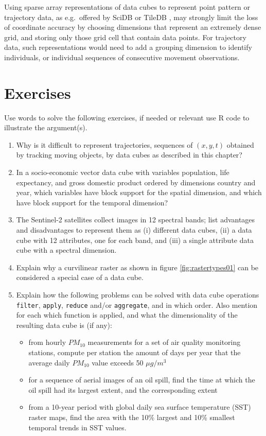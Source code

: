 \documentclass[]{book}
\providecommand{\tightlist}{%
  \setlength{\itemsep}{0pt}\setlength{\parskip}{0pt}}
\begin{document}
Using sparse array representations of data cubes to represent
point pattern or trajectory data, as e.g.~offered by SciDB
\citep{brown2010overview} or TileDB \citep{tiledb}, may strongly limit the
loss of coordinate accuracy by choosing dimensions that represent
an extremely dense grid, and storing only those grid cell that
contain data points. For trajectory data, such representations
would need to add a grouping dimension to identify individuals,
or individual sequences of consecutive movement observations.

\hypertarget{exercises-5}{%
\section{Exercises}\label{exercises-5}}

Use words to solve the following exercises, if needed or relevant
use R code to illustrate the argument(s).

\begin{enumerate}
\def\labelenumi{\arabic{enumi}.}
\item
  Why is it difficult to represent trajectories, sequences of
  \((x,y,t)\) obtained by tracking moving objects, by data cubes as
  described in this chapter?
\item
  In a socio-economic vector data cube with variables population,
  life expectancy, and gross domestic product ordered by dimensions country and
  year, which variables have block support for the spatial dimension,
  and which have block support for the temporal dimension?
\item
  The Sentinel-2 satellites collect images in 12 spectral bands;
  list advantages and disadvantages to represent them as (i) different
  data cubes, (ii) a data cube with 12 attributes, one for each band,
  and (iii) a single attribute data cube with a spectral dimension.
\item
  Explain why a curvilinear raster as shown in figure
  \ref{fig:rastertypes01} can be considered a special case of a
  data cube.
\item
  Explain how the following problems can be solved with data cube
  operations \texttt{filter}, \texttt{apply}, \texttt{reduce} and/or \texttt{aggregate}, and
  in which order. Also mention for each which function is applied,
  and what the dimensionality of the resulting data cube is (if any):

  \begin{itemize}
  \tightlist
  \item
    from hourly \(PM_{10}\) measurements for a set of air quality
    monitoring stations, compute per station the amount of days
    per year that the average daily \(PM_{10}\) value exceeds
    50 \(\mu g/m^3\)
  \item
    for a sequence of aerial images of an oil spill, find the
    time at which the oil spill had its largest extent, and the
    corresponding extent
  \item
    from a 10-year period with global daily sea surface temperature
    (SST) raster maps, find the area with the 10\% largest and 10\%
    smallest temporal trends in SST values.
  \end{itemize}
\end{enumerate}
\end{document}
